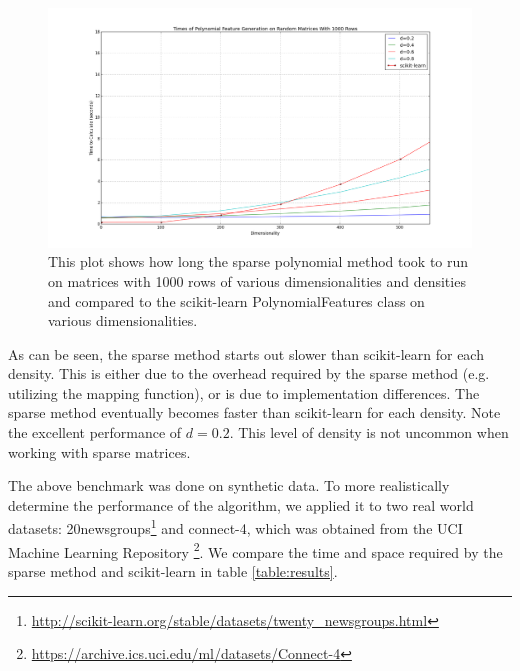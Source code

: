 \documentclass[11pt,twocolumn]{article}
\begin{document}
\begin{figure}[h]
    \includegraphics[scale=0.3]{benchmark_results.png}
    \caption{This plot shows how long the sparse polynomial method took to run on matrices with 1000 rows of various dimensionalities and densities and compared to the scikit-learn PolynomialFeatures class on various dimensionalities.}
    \label{fig:benchmark}
    \centering
\end{figure}

As can be seen, the sparse method starts out slower than scikit-learn for each density. This
is either due to the overhead required by the sparse method (e.g. utilizing the mapping function),
or is due to implementation differences. The sparse method eventually becomes faster than scikit-learn
for each density. Note the excellent performance of $d=0.2$. This level of density is not uncommon when
working with sparse matrices.

The above benchmark was done on synthetic data. To more realistically determine the performance of
the algorithm, we applied it to two real world datasets: 20newsgroups\footnote{\url{http://scikit-learn.org/stable/datasets/twenty_newsgroups.html}} and connect-4, which was obtained
from the UCI Machine Learning Repository \cite{Lichman:2013}\footnote{\url{https://archive.ics.uci.edu/ml/datasets/Connect-4}}. We compare the time and space required by the sparse method and scikit-learn in table \eqref{table:results}.
\end{document}
